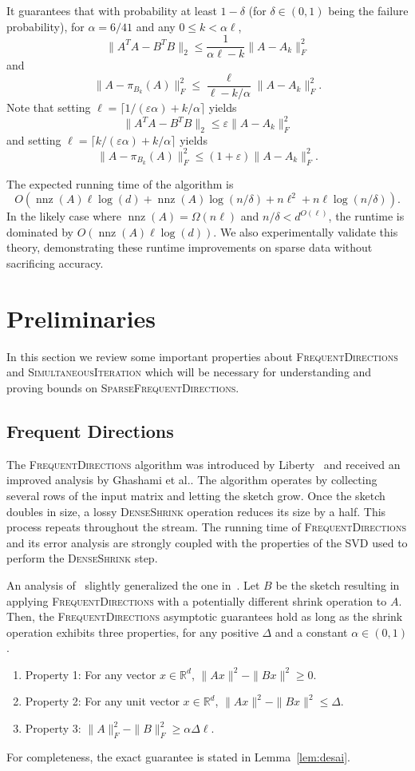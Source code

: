 \documentclass[11pt]{article}
\newcommand{\R}{\mathbb{R}}
\newcommand{\nnz}{\operatorname{nnz}}
\newcommand{\eps}{\varepsilon}
\newcommand{\fd}{\textsc{FrequentDirections}\xspace}
\newcommand{\sfd}{\textsc{SparseFrequentDirections}\xspace}
\newcommand{\si}{\textsc{SimultaneousIteration}\xspace}
\begin{document}
It guarantees that with probability at least $1-\delta$ (for $\delta \in (0,1)$ being the failure probability), for $\alpha = 6/41$ and any $0 \leq k < \alpha \ell$,
\[
\|A^T A - B^T B\|_2 \leq \frac{1}{\alpha \ell - k} \|A -A_k\|_F^2
\]
and
\[
\|A - \pi_{B_k}(A)\|_F^2 \leq \frac{\ell}{\ell - k/\alpha} \|A - A_k\|_F^2.
\] 
Note that setting $\ell = \lceil 1/(\eps\alpha) + k/\alpha\rceil$ yields 
\[
\|A^T A - B^T B\|_2 \leq \eps \|A -A_k\|_F^2
\]
and setting $\ell = \lceil k/(\eps\alpha) + k/\alpha\rceil$ yields 
\[
\|A - \pi_{B_k}(A)\|_F^2 \leq (1+\eps) \|A - A_k\|_F^2.
\]

The expected running time of the algorithm is
\[
O( \nnz(A)\ell \log(d) +  \nnz(A)\log (n/\delta)+ n\ell^2 + n\ell\log(n/\delta) ).
\] 
In the likely case where $\nnz(A) = \Omega (n \ell)$ and $n/\delta  < d^{O(\ell)}$, the runtime is dominated by $O(\nnz(A) \ell \log(d))$.  
We also experimentally validate this theory, demonstrating these runtime improvements on sparse data without sacrificing accuracy.  





\section{Preliminaries}

In this section we review some important properties about \fd and \si which will be necessary for understanding and proving bounds on  \sfd.  

\subsection{Frequent Directions}
\label{related:fd}

The \fd algorithm was introduced by Liberty~\cite{liberty2013simple} and received an improved analysis by Ghashami et al.\cite{ghashami2015frequent}. 
The algorithm operates by collecting several rows of the input matrix and letting the sketch grow.
Once the sketch doubles in size, a lossy \textsc{DenseShrink} operation reduces its size by a half.
This process repeats throughout the stream.
The running time of \fd and its error analysis are strongly coupled with the properties of the 
SVD used to perform the \textsc{DenseShrink} step.

An analysis of~\cite{desai2015improved} slightly generalized the one in~\cite{ghashami2015frequent}.
Let $B$ be the sketch resulting in applying \fd with a potentially different shrink operation to $A$. 
Then, the \fd asymptotic guarantees hold as long as the shrink operation exhibits three properties, for any positive $\Delta$ and a constant $\alpha \in (0,1)$.
\begin{enumerate} \item Property 1:  For any vector $x\in\R^d$, $\|Ax\|^2 - \|Bx\|^2 \geq 0$.
\item Property 2: For any unit vector $x\in\R^d$, $\|Ax\|^2 - \|Bx\|^2 \leq \Delta$.
\item Property 3: $\|A\|_F^2 - \|B\|_F^2 \geq \alpha \Delta \ell$.
\end{enumerate}
For completeness, the exact guarantee is stated in Lemma~\ref{lem:desai}.
\end{document}
